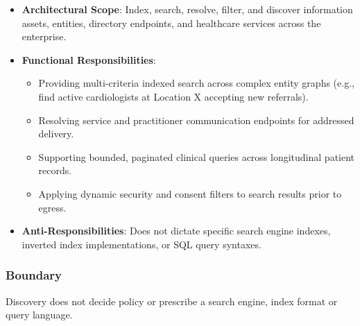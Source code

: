 \begin{itemize}

\item
\textbf{Architectural Scope}: Index, search, resolve, filter, and discover information assets, entities, directory endpoints, and healthcare services across the enterprise.



\item
\textbf{Functional Responsibilities}:


\begin{itemize}

\item
Providing multi-criteria indexed search across complex entity graphs (e.g., find active cardiologists at Location X accepting new referrals).



\item
Resolving service and practitioner communication endpoints for addressed delivery.



\item
Supporting bounded, paginated clinical queries across longitudinal patient records.



\item
Applying dynamic security and consent filters to search results prior to egress.



\end{itemize}


\item
\textbf{Anti-Responsibilities}: Does not dictate specific search engine indexes, inverted index implementations, or SQL query syntaxes.



\end{itemize}
\subsubsection*{Boundary}

Discovery does not decide policy or prescribe a search engine, index format or query language.

